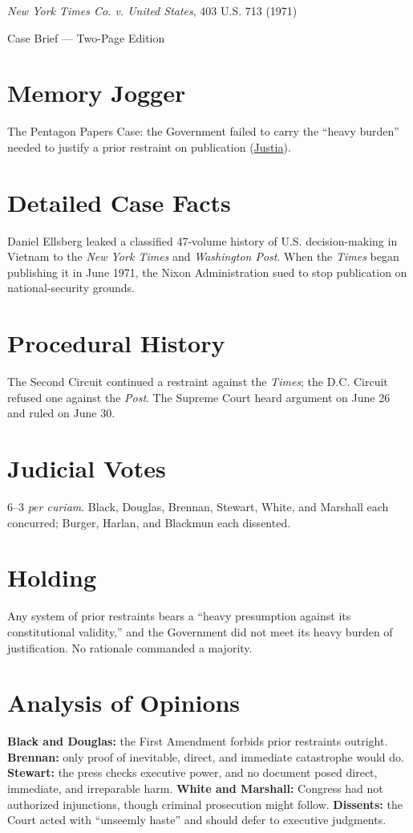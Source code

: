 \documentclass[12pt]{article}
\begin{document}
\begin{center}
{\LARGE \textit{New York Times Co. v. United States}, 403 U.S. 713 (1971)\par}
\vspace{0.5em}
{\large Case Brief --- Two-Page Edition\par}
\end{center}

\section{Memory Jogger}
The Pentagon Papers Case: the Government failed to carry the ``heavy burden'' needed to justify a prior restraint on publication (\href{https://supreme.justia.com/cases/federal/us/403/713/}{Justia}).

\section{Detailed Case Facts}
Daniel Ellsberg leaked a classified 47-volume history of U.S. decision-making in Vietnam to the \textit{New York Times} and \textit{Washington Post}. When the \textit{Times} began publishing it in June 1971, the Nixon Administration sued to stop publication on national-security grounds.

\section{Procedural History}
The Second Circuit continued a restraint against the \textit{Times}; the D.C. Circuit refused one against the \textit{Post}. The Supreme Court heard argument on June 26 and ruled on June 30.

\section{Judicial Votes}
6--3 \textit{per curiam}. Black, Douglas, Brennan, Stewart, White, and Marshall each concurred; Burger, Harlan, and Blackmun each dissented.

\section{Holding}
Any system of prior restraints bears a ``heavy presumption against its constitutional validity,'' and the Government did not meet its heavy burden of justification. No rationale commanded a majority.

\section{Analysis of Opinions}
\textbf{Black and Douglas:} the First Amendment forbids prior restraints outright. \textbf{Brennan:} only proof of inevitable, direct, and immediate catastrophe would do. \textbf{Stewart:} the press checks executive power, and no document posed direct, immediate, and irreparable harm. \textbf{White and Marshall:} Congress had not authorized injunctions, though criminal prosecution might follow. \textbf{Dissents:} the Court acted with ``unseemly haste'' and should defer to executive judgments.
\end{document}
